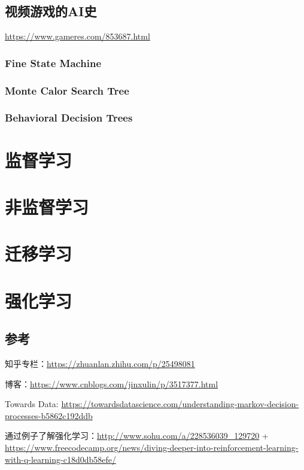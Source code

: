 \documentclass[UTF8,a4paper,12pt]{ctexbook}
\begin{document}
	
	\section{视频游戏的AI史}
		\url{https://www.gameres.com/853687.html}
		
		\subsection{Fine State Machine}
		
		\subsection{Monte Calor Search Tree}
		
		\subsection{Behavioral Decision Trees}
		
		
		
\chapter{监督学习}



\chapter{非监督学习}



\chapter{迁移学习}



\chapter{强化学习}
	\section{参考}
		知乎专栏：\url{https://zhuanlan.zhihu.com/p/25498081}
		
		博客：\url{https://www.cnblogs.com/jinxulin/p/3517377.html}
		
		Towards Data: \url{https://towardsdatascience.com/understanding-markov-decision-processes-b5862c192ddb}
		
		通过例子了解强化学习：\url{http://www.sohu.com/a/228536039_129720} + \\ \url{https://www.freecodecamp.org/news/diving-deeper-into-reinforcement-learning-with-q-learning-c18d0db58efe/}
		
\end{document}
